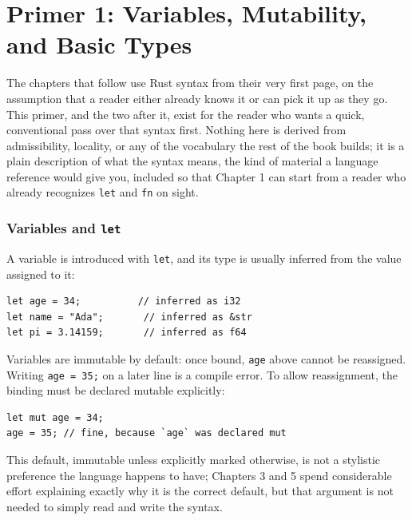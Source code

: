 \documentclass[11pt]{book}
\begin{document}
\clearpage

\tableofcontents

\clearpage

\chapter*{Primer 1: Variables, Mutability, and Basic Types}

The chapters that follow use Rust syntax from their very first page, on the assumption that a reader either already knows it or can pick it up as they go. This primer, and the two after it, exist for the reader who wants a quick, conventional pass over that syntax first. Nothing here is derived from admissibility, locality, or any of the vocabulary the rest of the book builds; it is a plain description of what the syntax means, the kind of material a language reference would give you, included so that Chapter 1 can start from a reader who already recognizes \texttt{let} and \texttt{fn} on sight.

\subsection*{Variables and \texttt{let}}

A variable is introduced with \texttt{let}, and its type is usually inferred from the value assigned to it:

\begin{lstlisting}
let age = 34;          // inferred as i32
let name = "Ada";       // inferred as &str
let pi = 3.14159;       // inferred as f64
\end{lstlisting}

Variables are immutable by default: once bound, \texttt{age} above cannot be reassigned. Writing \texttt{age = 35;} on a later line is a compile error. To allow reassignment, the binding must be declared mutable explicitly:

\begin{lstlisting}
let mut age = 34;
age = 35; // fine, because `age` was declared mut
\end{lstlisting}

This default, immutable unless explicitly marked otherwise, is not a stylistic preference the language happens to have; Chapters 3 and 5 spend considerable effort explaining exactly why it is the correct default, but that argument is not needed to simply read and write the syntax.
\end{document}
